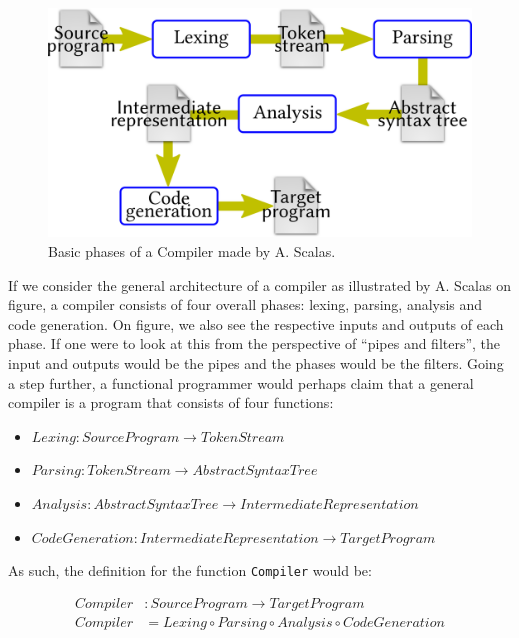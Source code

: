 \begin{figure}[H]
\centering
\includegraphics[width=\textwidth]{Pictures/basic_compiler_phases.png}
\caption{Basic phases of a Compiler made by A. Scalas.}
\label{fig:compiler_phases}
\end{figure}

If we consider the general architecture of a compiler as illustrated by A. Scalas on figure, a compiler consists of four overall phases:
lexing, parsing, analysis and code generation. On figure, we also see the respective inputs and outputs of each phase. If one were to
look at this from the perspective of ``pipes and filters'', the input and outputs would be the pipes and the phases would be the filters.
Going a step further, a functional programmer would perhaps claim that a general compiler is a program that consists of four functions:

\begin{itemize}
  \item $Lexing : SourceProgram \rightarrow TokenStream$
  \item $Parsing : TokenStream \rightarrow AbstractSyntaxTree$
  \item $Analysis : AbstractSyntaxTree \rightarrow IntermediateRepresentation$
  \item $CodeGeneration : IntermediateRepresentation \rightarrow TargetProgram$
\end{itemize}

As such, the definition for the function \texttt{Compiler} would be:

\begin{align*}
  Compiler &: SourceProgram \rightarrow TargetProgram \\
  Compiler &= Lexing \circ Parsing \circ Analysis \circ CodeGeneration
\end{align*}

